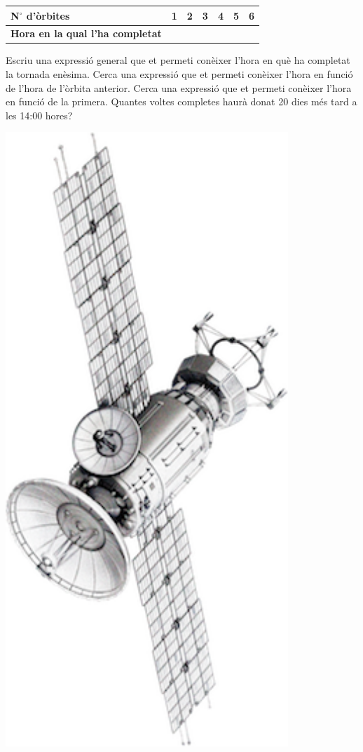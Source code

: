 \begin{mylist}
\begin{minipage}{0.84\textwidth}
\begin{tasks}
	\begin{tabular}{|p{1.5in}|p{0.34in}|p{0.34in}|p{0.34in}|p{0.34in}|p{0.34in}|p{0.34in}|} \hline 
		\textbf{N${}^\circ$  d'òrbites} & \textbf{1} & \textbf{2} & \textbf{3} & \textbf{4} & \textbf{5} & \textbf{6} \\ \hline 
		\textbf{Hora en la qual l'ha completat} &  &  &  &  &  &  \\ \hline 
	\end{tabular}
%
\task Escriu una expressió general que et permeti conèixer l'hora en què ha completat la tornada enèsima.
%
\task Cerca una expressió que et permeti conèixer l'hora en funció de l'hora de l'òrbita anterior.
%
\task Cerca una expressió que et permeti conèixer l'hora en funció de la primera.
%
\task Quantes voltes completes haurà donat 20 dies més tard a les 14:00 hores?
\end{tasks}
\end{minipage}
\begin{minipage}{0.16\textwidth}
	\centering
	\includegraphics[width=0.8\textwidth]{img-03/satellite}
\end{minipage}


\end{mylist}
